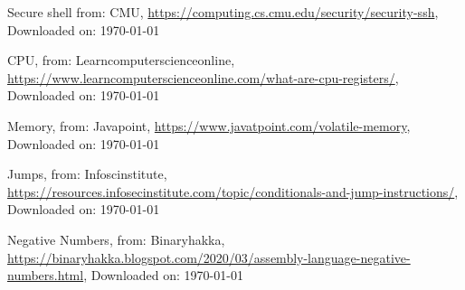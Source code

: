 \begin{thebibliography}{10}
	Secure shell from: CMU,
	\url{https://computing.cs.cmu.edu/security/security-ssh},
	Downloaded on: \today

	CPU, from: Learncomputerscienceonline,
	\url{https://www.learncomputerscienceonline.com/what-are-cpu-registers/},
	Downloaded on: \today

	Memory, from: Javapoint,
	\url{https://www.javatpoint.com/volatile-memory},
	Downloaded on: \today

	Jumps, from: Infoscinstitute,
	\url{https://resources.infosecinstitute.com/topic/conditionals-and-jump-instructions/},
	Downloaded on: \today

	Negative Numbers, from: Binaryhakka,
	\url{https://binaryhakka.blogspot.com/2020/03/assembly-language-negative-numbers.html},
	Downloaded on: \today

\end{thebibliography}
